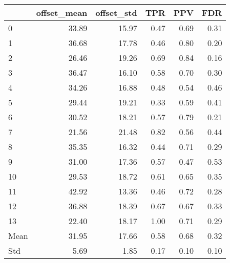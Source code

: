 \begin{tabular}{lrrrrr}
\toprule
{} &  offset\_mean &  offset\_std &   TPR &   PPV &   FDR \\
\midrule
0    &        33.89 &       15.97 &  0.47 &  0.69 &  0.31 \\
1    &        36.68 &       17.78 &  0.46 &  0.80 &  0.20 \\
2    &        26.46 &       19.26 &  0.69 &  0.84 &  0.16 \\
3    &        36.47 &       16.10 &  0.58 &  0.70 &  0.30 \\
4    &        34.26 &       16.88 &  0.48 &  0.54 &  0.46 \\
5    &        29.44 &       19.21 &  0.33 &  0.59 &  0.41 \\
6    &        30.52 &       18.21 &  0.57 &  0.79 &  0.21 \\
7    &        21.56 &       21.48 &  0.82 &  0.56 &  0.44 \\
8    &        35.35 &       16.32 &  0.44 &  0.71 &  0.29 \\
9    &        31.00 &       17.36 &  0.57 &  0.47 &  0.53 \\
10   &        29.53 &       18.72 &  0.61 &  0.65 &  0.35 \\
11   &        42.92 &       13.36 &  0.46 &  0.72 &  0.28 \\
12   &        36.88 &       18.39 &  0.67 &  0.67 &  0.33 \\
13   &        22.40 &       18.17 &  1.00 &  0.71 &  0.29 \\
Mean &        31.95 &       17.66 &  0.58 &  0.68 &  0.32 \\
Std  &         5.69 &        1.85 &  0.17 &  0.10 &  0.10 \\
\bottomrule
\end{tabular}
